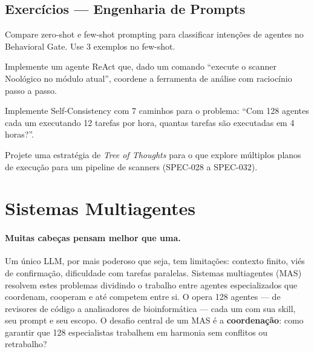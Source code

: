 \subsection{Exercícios — Engenharia de Prompts}
\begin{exercicio}
Compare zero-shot e few-shot prompting para classificar intenções de
agentes no Behavioral Gate. Use 3 exemplos no few-shot.
\end{exercicio}
\begin{exercicio}
Implemente um agente ReAct que, dado um comando ``execute o scanner
Noológico no módulo atual'', coordene a ferramenta de análise com
raciocínio passo a passo.
\end{exercicio}
\begin{exercicio}
Implemente Self-Consistency com 7 caminhos para o problema: ``Com 128
agentes cada um executando 12 tarefas por hora, quantas tarefas são
executadas em 4 horas?''.
\end{exercicio}
\begin{exercicio}
Projete uma estratégia de \textit{Tree of Thoughts} para o \opencodeeco{}
que explore múltiplos planos de execução para um pipeline de scanners
(SPEC-028 a SPEC-032).
\end{exercicio}
\section{Sistemas Multiagentes}
\label{sec:sistemas-multiagentes}
\nivelavancado

\paragraph{Muitas cabeças pensam melhor que uma.} Um único LLM, por mais
poderoso que seja, tem limitações: contexto finito, viés de confirmação,
dificuldade com tarefas paralelas. Sistemas multiagentes (MAS) resolvem
estes problemas dividindo o trabalho entre agentes especializados que
coordenam, cooperam e até competem entre si. O \opencodeeco{} opera 128
agentes --- de revisores de código a analisadores de bioinformática --- cada
um com sua skill, seu prompt e seu escopo. O desafio central de um MAS é a
\textbf{coordenação}: como garantir que 128 especialistas trabalhem em
harmonia sem conflitos ou retrabalho?

